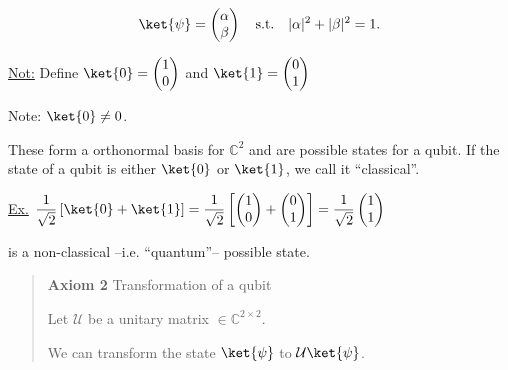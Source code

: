\documentclass[11pt]{article}
\begin{document}
\[
\ket{\psi} = \begin{pmatrix} \alpha \\ \beta \end{pmatrix} \quad \text{s.t.} \quad |\alpha|^2 + |\beta|^2 = 1.
\]

\underline{Not:} Define $\ket{0} = \begin{pmatrix} 1 \\ 0 \end{pmatrix}$ and $\ket{1} = \begin{pmatrix} 0 \\ 1 \end{pmatrix}$

Note: $\ket{0} \neq 0$.

These form a orthonormal basis for $\mathbb{C}^2$ and are possible states for a qubit. If the state of a qubit is either $\ket{0}$ or $\ket{1}$, we call it ``classical''.

\underline{Ex.} $\dfrac{1}{\sqrt{2}}\left[\ket{0} + \ket{1}\right] = \dfrac{1}{\sqrt{2}}\left[\begin{pmatrix}1\\0\end{pmatrix} + \begin{pmatrix}0\\1\end{pmatrix}\right] = \dfrac{1}{\sqrt{2}}\begin{pmatrix}1\\1\end{pmatrix}$

is a non-classical --i.e. ``quantum''-- possible state.

\begin{quote}
\textbf{Axiom 2} Transformation of a qubit

Let $\mathcal{U}$ be a unitary matrix $\in \mathbb{C}^{2\times 2}$.

We can transform the state $\ket{\psi}$ to $\mathcal{U}\ket{\psi}$.
\end{quote}

\begin{figure}[h]
\centering
{}
\end{figure}
\end{document}
